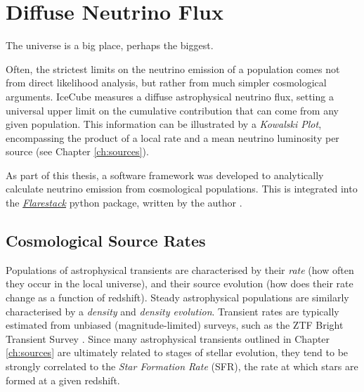 \setchapterpreamble[u]{\margintoc}
\chapter{Diffuse Neutrino Flux}
\begin{fquote}The universe is a big place, perhaps the biggest.
\end{fquote}

Often, the strictest limits on the neutrino emission of a population comes not from direct likelihood analysis, but rather from much simpler cosmological arguments. IceCube measures a diffuse astrophysical neutrino flux, setting a universal upper limit on the cumulative contribution that can come from any given population. This information can be illustrated by a \emph{Kowalski Plot}, encompassing the product of a local rate and a mean neutrino luminosity per source (see Chapter \ref{ch:sources}). 

As part of this thesis, a software framework was developed to analytically calculate neutrino emission from cosmological populations. This is integrated into the \emph{\href{https://github.com/IceCubeOpenSource/flarestack}{Flarestack}} python package, written by the author .

\section{Cosmological Source Rates}

Populations of astrophysical transients are characterised by their \emph{rate} (how often they occur in the local universe), and their source evolution (how does their rate change as a function of redshift). Steady astrophysical populations are similarly characterised by a \emph{density} and \emph{density evolution}. Transient rates are typically estimated from unbiased (magnitude-limited) surveys, such as the ZTF Bright Transient Survey . Since many astrophysical transients outlined in Chapter \ref{ch:sources} are ultimately related to stages of stellar evolution, they tend to be strongly correlated to the \emph{Star Formation Rate} (SFR), the rate at which stars are formed at a given redshift. 

